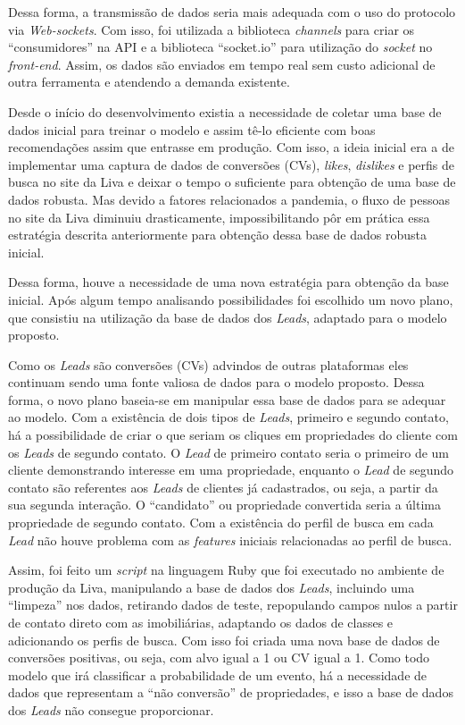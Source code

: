 Dessa forma, a transmissão de dados seria mais adequada com o uso do protocolo via \textit{Web-sockets}. Com isso, foi utilizada a biblioteca \textit{channels} para criar os “consumidores'' na API e a biblioteca “socket.io'' para utilização do \textit{socket} no \textit{front-end}. Assim, os dados são enviados em tempo real sem custo adicional de outra ferramenta e atendendo a demanda existente.

Desde o início do desenvolvimento existia a necessidade de coletar uma base de dados inicial para treinar o modelo e assim tê-lo eficiente com boas recomendações assim que entrasse em produção. Com isso, a ideia inicial era a de implementar uma captura de dados de conversões (CVs), \textit{likes}, \textit{dislikes} e perfis de busca no site da Liva e deixar o tempo o suficiente para obtenção de uma base de dados robusta. Mas devido a fatores relacionados a pandemia, o fluxo de pessoas no site da Liva diminuiu drasticamente, impossibilitando pôr em prática essa estratégia descrita anteriormente para obtenção dessa base de dados robusta inicial.

Dessa forma, houve a necessidade de uma nova estratégia para obtenção da base inicial. Após algum tempo analisando possibilidades foi escolhido um novo plano, que consistiu na utilização da base de dados dos \textit{Leads}, adaptado para o modelo proposto.

Como os \textit{Leads} são conversões (CVs) advindos de outras plataformas eles continuam sendo uma fonte valiosa de dados para o modelo proposto. Dessa forma, o novo plano baseia-se em manipular essa base de dados para se adequar ao modelo. Com a existência de dois tipos de \textit{Leads}, primeiro e segundo contato, há a possibilidade de criar o que seriam os cliques em propriedades do cliente com os \textit{Leads} de segundo contato. O \textit{Lead} de primeiro contato seria o primeiro de um cliente demonstrando interesse em uma propriedade, enquanto o \textit{Lead} de segundo contato são referentes aos \textit{Leads} de clientes já cadastrados, ou seja, a partir da sua segunda interação. O “candidato'' ou propriedade convertida seria a última propriedade de segundo contato. Com a  existência do perfil de busca em cada \textit{Lead} não houve problema com as \textit{features} iniciais relacionadas ao perfil de busca.

Assim, foi feito um \textit{script} na linguagem Ruby que foi executado no ambiente de produção da Liva, manipulando a base de dados dos \textit{Leads}, incluindo uma “limpeza'' nos dados, retirando dados de teste, repopulando campos nulos a partir de contato direto com as imobiliárias, adaptando os dados de classes e adicionando os perfis de busca. Com isso foi criada uma nova base de dados de conversões positivas, ou seja, com alvo igual a 1 ou CV igual a 1. Como todo modelo que irá classificar a probabilidade de um evento, há a necessidade de dados que representam a “não conversão'' de propriedades, e isso a base de dados dos \textit{Leads} não consegue proporcionar.

